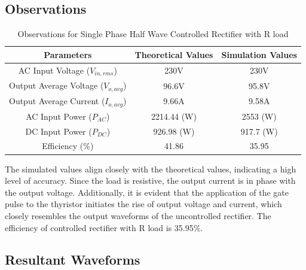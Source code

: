 \subsection{Observations}

\begin{table}[h]
    \renewcommand{\arraystretch}{1.3}
    \label{table_observation_5}
    \centering
    \begin{tabular}{|c|c|c|}
        \hline
        Parameters                              & Theoretical Values & Simulation Values \\
        \hline
        \hline
        AC Input Voltage ($ V_{in,rms} $)       & 230V               & 230V              \\
        \hline
        Output Average Voltage ($ V_{o,avg} $)  & 96.6V              & 95.8V            \\
        \hline
        Output Average Current ($ I_{o,avg}  $) & 9.66A              & 9.58A            \\
        \hline
        AC Input Power ($ P_{AC}  $)            & 2214.44 (W)        & 2553 (W)          \\
        \hline
        DC Input Power ($ P_{DC}  $)            & 926.98 (W)         & 917.7 (W)         \\
        \hline
        Efficiency (\%)                         & 41.86              & 35.95             \\
        \hline
    \end{tabular}
    \caption{Observations for Single Phase Half Wave Controlled Rectifier with R load}

\end{table}


The simulated values align closely with the theoretical values, indicating a high level of accuracy. Since the load is resistive, the output current is in phase with the output voltage. Additionally, it is evident that the application of the gate pulse to the thyristor initiates the rise of output voltage and current, which closely resembles the output waveforms of the uncontrolled rectifier.
The efficiency of controlled rectifier with R load is 35.95\%.

\pagebreak


\subsection{Resultant Waveforms}

